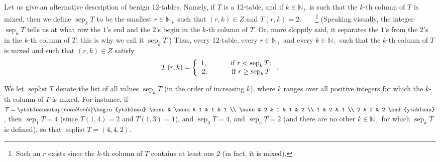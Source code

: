\documentclass[numbers=enddot,12pt,final,onecolumn,notitlepage]{scrartcl}%
\theoremstyle{definition}
\begin{document}
Let us give an alternative description of benign 12-tables. Namely, if $T$ is
a 12-table, and if $k\in\mathbb{N}_{+}$ is such that the $k$-th column of $T$
is mixed, then we define $\operatorname*{sep}\nolimits_{k}T$ to be the
smallest $r\in\mathbb{N}_{+}$ such that $\left(  r,k\right)  \in Z$ and
$T\left(  r,k\right)  =2$.\ \ \ \ \footnote{Such an $r$ exists since the
$k$-th column of $T$ contains at least one $2$ (in fact, it is mixed).}
(Speaking visually, the integer $\operatorname*{sep}\nolimits_{k}T$ tells us
at what row the $1$'s end and the $2$'s begin in the $k$-th column of $T$. Or,
more sloppily said, it separates the $1$'s from the $2$'s in the $k$-th column
of $T$; this is why we call it $\operatorname*{sep}\nolimits_{k}T$.) Thus,
every 12-table, every $r\in\mathbb{N}_{+}$ and every $k\in\mathbb{N}_{+}$ such
that the $k$-th column of $T$ is mixed and such that $\left(  r,k\right)  \in
Z$ satisfy%
\begin{equation}
T\left(  r,k\right)  =\left\{
\begin{array}
[c]{c}%
1,\ \ \ \ \ \ \ \ \ \ \text{if }r<\operatorname*{sep}\nolimits_{k}T;\\
2,\ \ \ \ \ \ \ \ \ \ \text{if }r\geq\operatorname*{sep}\nolimits_{k}T
\end{array}
\right.  . \label{pf.lem.BK.Tsep}%
\end{equation}


We let $\operatorname*{seplist}T$ denote the list of all values
$\operatorname*{sep}\nolimits_{k}T$ (in the order of increasing $k$), where
$k$ ranges over all positive integers for which the $k$-th column of $T$ is
mixed. For instance, if $T=%
\ytableausetup{notabloids}
\begin{ytableau}
\none& \none& 1 & 1 & 1 \\
\none& 2 & 1 & 1 & 2 \\
1 & 2 & 1 \\
2 & 2 & 2
\end{ytableau}%
$, then $\operatorname*{sep}\nolimits_{1}T=4$ (since $T\left(  1,4\right)  =2$
and $T\left(  1,3\right)  =1$), and $\operatorname*{sep}\nolimits_{3}T=4$, and
$\operatorname*{sep}\nolimits_{5}T=2$ (and there are no other $k\in
\mathbb{N}_{+}$ for which $\operatorname*{sep}\nolimits_{k}T$ is defined), so
that $\operatorname*{seplist}T=\left(  4,4,2\right)  $.
\end{document}
